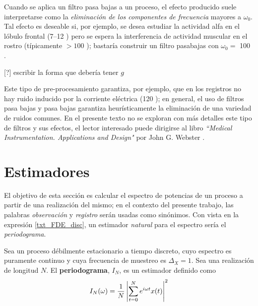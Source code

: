 Cuando se aplica un filtro pasa bajas a un proceso, el efecto producido suele interpretarse como la \textit{eliminación de los componentes de frecuencia} mayores a $\omega_0$. 
%
Tal efecto es deseable si, por ejemplo, se desea estudiar la actividad alfa en el lóbulo frontal (7--12 \hz) pero se espera la interferencia de actividad muscular en el rostro (típicamente $>100$ \hz); bastaría construir un filtro pasabajas con $\omega_0 = $ 100 \hz.

[?] escribir la forma que debería tener $g$

Este tipo de pre-procesamiento garantiza, por ejemplo, que en los registros no hay ruido inducido por la corriente eléctrica (120 \hz); en general, el uso de filtros pasa bajas y pasa bajas garantiza heurísticamente la eliminación de una variedad de ruidos comunes.
%
En el presente texto no se exploran con más detalles este tipo de filtros y sus efectos, el lector interesado puede dirigirse al libro \textit{``Medical {I}nstrumentation. {A}pplications and {D}esign"} por John G. Webster \cite{Webster}.


\section{Estimadores}
\label{sec:estimadores}

El objetivo de esta sección es calcular el espectro de potencias de un proceso a partir de una realización del mismo; en el contexto del presente trabajo, las palabras \textit{observación} y \textit{registro} serán usadas como sinónimos.
%
Con vista en la expresión \ref{txt_FDE_disc}, un estimador \textit{natural} para el espectro sería el \textit{periodograma}.

\begin{definicion}
Sea \xt un proceso débilmente estacionario a tiempo discreto, cuyo espectro es puramente continuo y cuya frecuencia de muestreo es $\Delta_X=1$. Sea \xtd una realización de longitud $N$. 
%
El \textbf{periodograma}, $I_N$, es un estimador 
definido como
\begin{equation}
I_N(\omega) = \frac{1}{N} \left| \sum_{t = 0}^{N} e^{i \omega t} x(t) \right|^{2}
\end{equation}
\label{txt_periodograma}
\end{definicion}

